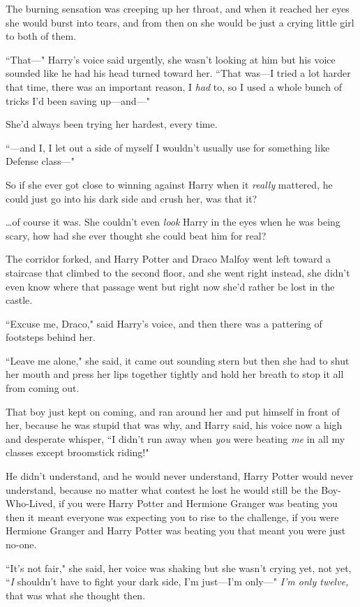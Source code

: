 The burning sensation was creeping up her throat, and when it reached her eyes she would burst into tears, and from then on she would be just a crying little girl to both of them.

``That—" Harry's voice said urgently, she wasn't looking at him but his voice sounded like he had his head turned toward her. ``That was—I tried a lot harder that time, there was an important reason, I \emph{had} to, so I used a whole bunch of tricks I'd been saving up—and—"

She'd always been trying her hardest, every time.

``—and I, I let out a side of myself I wouldn't usually use for something like Defense class—"

So if she ever got close to winning against Harry when it \emph{really} mattered, he could just go into his dark side and crush her, was that it?

{\ldots}of course it was. She couldn't even \emph{look} Harry in the eyes when he was being scary, how had she ever thought she could beat him for real?

The corridor forked, and Harry Potter and Draco Malfoy went left toward a staircase that climbed to the second floor, and she went right instead, she didn't even know where that passage went but right now she'd rather be lost in the castle.

``Excuse me, Draco," said Harry's voice, and then there was a pattering of footsteps behind her.

``Leave me alone," she said, it came out sounding stern but then she had to shut her mouth and press her lips together tightly and hold her breath to stop it all from coming out.

That boy just kept on coming, and ran around her and put himself in front of her, because he was stupid that was why, and Harry said, his voice now a high and desperate whisper, ``I didn't run away when \emph{you} were beating \emph{me} in all my classes except broomstick riding!"

He didn't understand, and he would never understand, Harry Potter would never understand, because no matter what contest he lost he would still be the Boy-Who-Lived, if you were Harry Potter and Hermione Granger was beating you then it meant everyone was expecting you to rise to the challenge, if you were Hermione Granger and Harry Potter was beating you that meant you were just no-one.

``It's not fair," she said, her voice was shaking but she wasn't crying yet, not yet, ``\emph{I} shouldn't have to fight your dark side, I'm just—I'm only—" \emph{I'm only twelve,} that was what she thought then.

